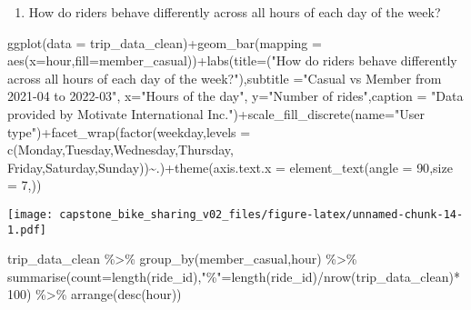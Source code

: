 \documentclass[
]{article}
\newenvironment{Shaded}{\begin{snugshade}}{\end{snugshade}}
\newcommand{\AttributeTok}[1]{\textcolor[rgb]{0.77,0.63,0.00}{#1}}
\newcommand{\DecValTok}[1]{\textcolor[rgb]{0.00,0.00,0.81}{#1}}
\newcommand{\FunctionTok}[1]{\textcolor[rgb]{0.00,0.00,0.00}{#1}}
\newcommand{\NormalTok}[1]{#1}
\newcommand{\OtherTok}[1]{\textcolor[rgb]{0.56,0.35,0.01}{#1}}
\newcommand{\SpecialCharTok}[1]{\textcolor[rgb]{0.00,0.00,0.00}{#1}}
\newcommand{\StringTok}[1]{\textcolor[rgb]{0.31,0.60,0.02}{#1}}
\providecommand{\tightlist}{%
  \setlength{\itemsep}{0pt}\setlength{\parskip}{0pt}}
\begin{document}
\begin{enumerate}
\def\labelenumi{\arabic{enumi}.}
\setcounter{enumi}{3}
\tightlist
\item
  How do riders behave differently across all hours of each day of the
  week?
\end{enumerate}

\begin{Shaded}
\begin{Highlighting}[]
\FunctionTok{ggplot}\NormalTok{(}\AttributeTok{data =}\NormalTok{ trip\_data\_clean)}\SpecialCharTok{+}\FunctionTok{geom\_bar}\NormalTok{(}\AttributeTok{mapping =} \FunctionTok{aes}\NormalTok{(}\AttributeTok{x=}\NormalTok{hour,}\AttributeTok{fill=}\NormalTok{member\_casual))}\SpecialCharTok{+}\FunctionTok{labs}\NormalTok{(}\AttributeTok{title=}\NormalTok{(}\StringTok{"How do riders behave differently across all hours of each day of the week?"}\NormalTok{),}\AttributeTok{subtitle =}\StringTok{"Casual vs Member from 2021{-}04 to 2022{-}03"}\NormalTok{, }\AttributeTok{x=}\StringTok{"Hours of the day"}\NormalTok{, }\AttributeTok{y=}\StringTok{"Number of rides"}\NormalTok{,}\AttributeTok{caption =} \StringTok{"Data provided by Motivate International Inc."}\NormalTok{)}\SpecialCharTok{+}\FunctionTok{scale\_fill\_discrete}\NormalTok{(}\AttributeTok{name=}\StringTok{"User type"}\NormalTok{)}\SpecialCharTok{+}\FunctionTok{facet\_wrap}\NormalTok{(}\FunctionTok{factor}\NormalTok{(weekday,}\AttributeTok{levels =} \FunctionTok{c}\NormalTok{(}\StringTok{\textquotesingle{}Monday\textquotesingle{}}\NormalTok{,}\StringTok{\textquotesingle{}Tuesday\textquotesingle{}}\NormalTok{,}\StringTok{\textquotesingle{}Wednesday\textquotesingle{}}\NormalTok{,}\StringTok{\textquotesingle{}Thursday\textquotesingle{}}\NormalTok{, }\StringTok{\textquotesingle{}Friday\textquotesingle{}}\NormalTok{,}\StringTok{\textquotesingle{}Saturday\textquotesingle{}}\NormalTok{,}\StringTok{\textquotesingle{}Sunday\textquotesingle{}}\NormalTok{))}\SpecialCharTok{\textasciitilde{}}\NormalTok{.)}\SpecialCharTok{+}\FunctionTok{theme}\NormalTok{(}\AttributeTok{axis.text.x =} \FunctionTok{element\_text}\NormalTok{(}\AttributeTok{angle =} \DecValTok{90}\NormalTok{,}\AttributeTok{size =} \DecValTok{7}\NormalTok{,))}
\end{Highlighting}
\end{Shaded}

\texttt{[image: capstone\_bike\_sharing\_v02\_files/figure-latex/unnamed-chunk-14-1.pdf]}

\begin{Shaded}
\begin{Highlighting}[]
\NormalTok{trip\_data\_clean }\SpecialCharTok{\%\textgreater{}\%} \FunctionTok{group\_by}\NormalTok{(member\_casual,hour) }\SpecialCharTok{\%\textgreater{}\%} \FunctionTok{summarise}\NormalTok{(}\AttributeTok{count=}\FunctionTok{length}\NormalTok{(ride\_id),}\StringTok{"\%"}\OtherTok{=}\FunctionTok{length}\NormalTok{(ride\_id)}\SpecialCharTok{/}\FunctionTok{nrow}\NormalTok{(trip\_data\_clean)}\SpecialCharTok{*}\DecValTok{100}\NormalTok{) }\SpecialCharTok{\%\textgreater{}\%} \FunctionTok{arrange}\NormalTok{(}\FunctionTok{desc}\NormalTok{(hour))}
\end{Highlighting}
\end{Shaded}
\end{document}
